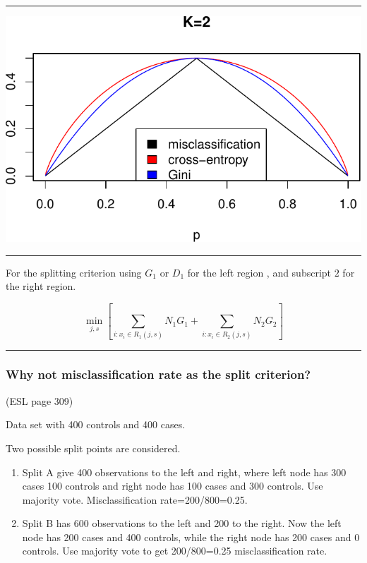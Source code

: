 \documentclass[
  letterpaper,
  DIV=11,
  numbers=noendperiod]{scrartcl}
\begin{document}
\begin{center}\rule{0.5\linewidth}{0.5pt}\end{center}

\includegraphics{L13_files/figure-pdf/unnamed-chunk-12-1.pdf}

\begin{center}\rule{0.5\linewidth}{0.5pt}\end{center}

For the splitting criterion using \(G_1\) or \(D_1\) for the left region
, and subscript \(2\) for the right region.

\[\min_{j,s} [ \sum_{i: x_i \in R_1(j,s)} N_1G_1 + \sum_{i: x_i \in R_2(j,s)} N_2 G_2]\]

\begin{center}\rule{0.5\linewidth}{0.5pt}\end{center}

\hypertarget{why-not-misclassification-rate-as-the-split-criterion}{%
\subsubsection{Why not misclassification rate as the split
criterion?}\label{why-not-misclassification-rate-as-the-split-criterion}}

(ESL page 309)

Data set with 400 controls and 400 cases.

Two possible split points are considered.

\begin{enumerate}
\def\labelenumi{\arabic{enumi})}
\item
  Split A give 400 observations to the left and right, where left node
  has 300 cases 100 controls and right node has 100 cases and 300
  controls. Use majority vote. Misclassification rate=200/800=0.25.
\item
  Split B has 600 observations to the left and 200 to the right. Now the
  left node has 200 cases and 400 controls, while the right node has 200
  cases and 0 controls. Use majority vote to get 200/800=0.25
  misclassification rate.
\end{enumerate}
\end{document}
